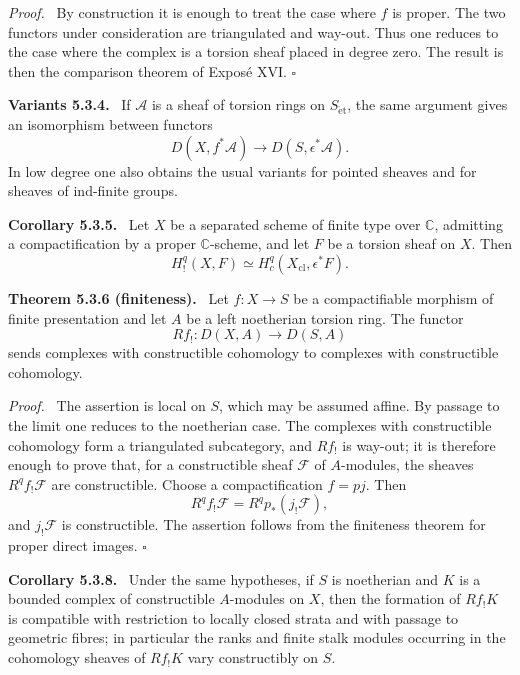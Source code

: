 \documentclass[12pt]{article}
\newcommand{\Aa}{\mathcal A}
\newcommand{\Ff}{\mathcal F}
\newcommand{\C}{\mathbb C}
\newcommand{\et}{\mathrm{\acute et}}
\newcommand{\cl}{\mathrm{cl}}
\newcommand{\qedtext}{\hfill\(\square\)}
\newenvironment{statement}[1]{\par\medskip\noindent\textbf{#1.}\ }{\par\medskip}
\newenvironment{remarktext}[1]{\par\medskip\noindent\textbf{#1.}\ }{\par\medskip}
\newenvironment{prooftext}[1][Proof]{\par\noindent\emph{#1.}\ }{\par\medskip}
\begin{document}
\begin{prooftext}
By construction it is enough to treat the case where \(f\) is proper. The two functors under consideration are triangulated and way-out. Thus one reduces to the case where the complex is a torsion sheaf placed in degree zero. The result is then the comparison theorem of Expos\'e XVI. \qedtext
\end{prooftext}

\begin{remarktext}{Variants 5.3.4}
If \(\Aa\) is a sheaf of torsion rings on \(S_{\et}\), the same argument gives an isomorphism between functors
\[
D(X,f^*\Aa)\longrightarrow D(S,\epsilon^*\Aa).
\]
In low degree one also obtains the usual variants for pointed sheaves and for sheaves of ind-finite groups.
\end{remarktext}

\begin{statement}{Corollary 5.3.5}
Let \(X\) be a separated scheme of finite type over \(\C\), admitting a compactification by a proper \(\C\)-scheme, and let \(F\) be a torsion sheaf on \(X\). Then
\[
H^q_!(X,F)\simeq H^q_c(X_{\cl},\epsilon^*F).
\]
\end{statement}

\begin{statement}{Theorem 5.3.6 (finiteness)}
Let \(f:X\to S\) be a compactifiable morphism of finite presentation and let \(A\) be a left noetherian torsion ring. The functor
\[
Rf_!:D(X,A)\longrightarrow D(S,A)
\]
sends complexes with constructible cohomology to complexes with constructible cohomology.
\end{statement}

\begin{prooftext}
The assertion is local on \(S\), which may be assumed affine. By passage to the limit one reduces to the noetherian case. The complexes with constructible cohomology form a triangulated subcategory, and \(Rf_!\) is way-out; it is therefore enough to prove that, for a constructible sheaf \(\Ff\) of \(A\)-modules, the sheaves \(R^qf_!\Ff\) are constructible. Choose a compactification \(f=pj\). Then
\[
R^qf_!\Ff=R^qp_*(j_!\Ff),
\]
and \(j_!\Ff\) is constructible. The assertion follows from the finiteness theorem for proper direct images. \qedtext
\end{prooftext}

\begin{statement}{Corollary 5.3.8}
Under the same hypotheses, if \(S\) is noetherian and \(K\) is a bounded complex of constructible \(A\)-modules on \(X\), then the formation of \(Rf_!K\) is compatible with restriction to locally closed strata and with passage to geometric fibres; in particular the ranks and finite stalk modules occurring in the cohomology sheaves of \(Rf_!K\) vary constructibly on \(S\).
\end{statement}
\end{document}

